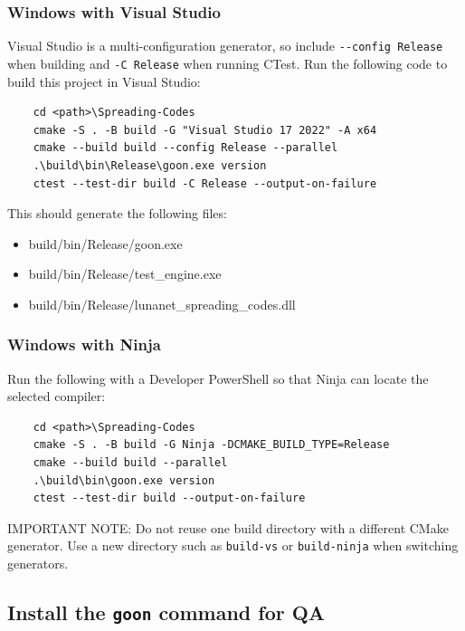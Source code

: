 \documentclass{article}
\begin{document}
\subsubsection*{Windows with Visual Studio}

Visual Studio is a multi-configuration generator, so include \verb|--config Release| when building and \verb|-C Release| when running CTest.
Run the following code to build this project in Visual Studio: 
\begin{verbatim}
    cd <path>\Spreading-Codes
    cmake -S . -B build -G "Visual Studio 17 2022" -A x64
    cmake --build build --config Release --parallel
    .\build\bin\Release\goon.exe version
    ctest --test-dir build -C Release --output-on-failure
\end{verbatim}
This should generate the following files: 
\begin{itemize}
    \item build/bin/Release/goon.exe
    \item build/bin/Release/test\_engine.exe
    \item build/bin/Release/lunanet\_spreading\_codes.dll
\end{itemize}

\subsubsection*{Windows with Ninja}

Run the following with a Developer PowerShell so that Ninja can locate the selected compiler: 
\begin{verbatim}
    cd <path>\Spreading-Codes
    cmake -S . -B build -G Ninja -DCMAKE_BUILD_TYPE=Release
    cmake --build build --parallel
    .\build\bin\goon.exe version
    ctest --test-dir build --output-on-failure
\end{verbatim}
IMPORTANT NOTE: Do not reuse one build directory with a different CMake generator. Use a new directory such as \verb|build-vs| or \verb|build-ninja| when switching generators.

\subsection*{Install the \texttt{goon} command for QA}
\end{document}
